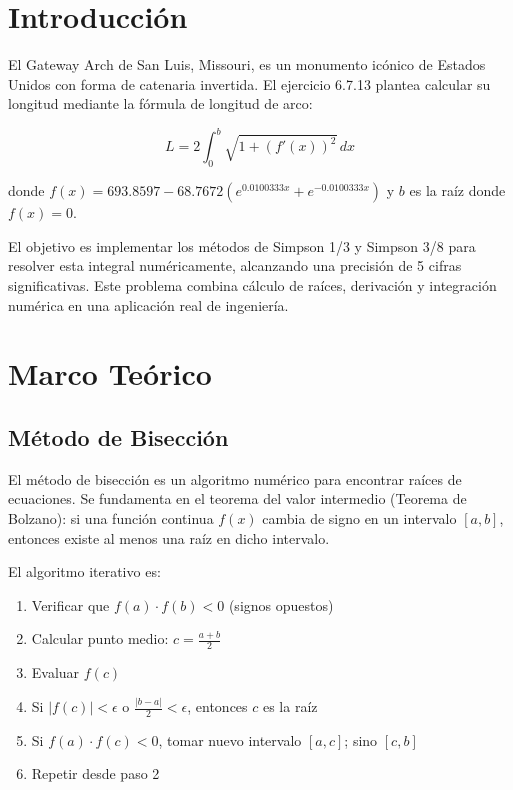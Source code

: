 \documentclass[conference]{IEEEtran}
\begin{document}
\section{Introducción}

El Gateway Arch de San Luis, Missouri, es un monumento icónico de Estados Unidos con forma de catenaria invertida. El ejercicio 6.7.13 plantea calcular su longitud mediante la fórmula de longitud de arco:

\begin{equation}
L = 2\int_{0}^{b} \sqrt{1 + \left(f'(x)\right)^2} \, dx
\end{equation}

donde $f(x) = 693.8597 - 68.7672\left(e^{0.0100333x} + e^{-0.0100333x}\right)$ y $b$ es la raíz donde $f(x) = 0$.

El objetivo es implementar los métodos de Simpson 1/3 y Simpson 3/8 para resolver esta integral numéricamente, alcanzando una precisión de 5 cifras significativas. Este problema combina cálculo de raíces, derivación y integración numérica en una aplicación real de ingeniería.

\section{Marco Teórico}

\subsection{Método de Bisección}

El método de bisección es un algoritmo numérico para encontrar raíces de ecuaciones. Se fundamenta en el teorema del valor intermedio (Teorema de Bolzano): si una función continua $f(x)$ cambia de signo en un intervalo $[a,b]$, entonces existe al menos una raíz en dicho intervalo.

El algoritmo iterativo es:

\begin{enumerate}
    \item Verificar que $f(a) \cdot f(b) < 0$ (signos opuestos)
    \item Calcular punto medio: $c = \frac{a+b}{2}$
    \item Evaluar $f(c)$
    \item Si $|f(c)| < \epsilon$ o $\frac{|b-a|}{2} < \epsilon$, entonces $c$ es la raíz
    \item Si $f(a) \cdot f(c) < 0$, tomar nuevo intervalo $[a,c]$; sino $[c,b]$
    \item Repetir desde paso 2
\end{enumerate}
\end{document}
